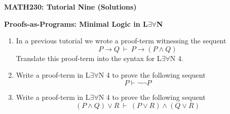 \documentclass[11pt]{report}
\begin{document}
	
	
\begin{center}
	{\bf MATH230: Tutorial Nine (Solutions)}
\end{center}
\begin{center}
	{\bf Proofs-as-Programs: Minimal Logic in L$\exists\forall$N}
\end{center}


\noindent{}
\newline
\vspace{0.5cm}


\begin{enumerate}

	\item In a previous tutorial we wrote a proof-term witnessing the sequent $$ P \rightarrow Q \ \vdash \ P \rightarrow ( P \land  Q)$$
	Translate this proof-term into the syntax for L$\exists\forall$N 4.

	\vspace{3cm}

	\item Write a proof-term in L$\exists\forall$N 4 to prove the following sequent $$ P\vdash \lnot \lnot  P$$
	 

	\vspace{3cm}

	\item Write a proof-term in L$\exists\forall$N 4 to prove the following sequent $$( P\land  Q) \lor  R \ \vdash \ ( P\lor  R) \land ( Q \lor  R)$$
	

\end{enumerate}
\end{document}
